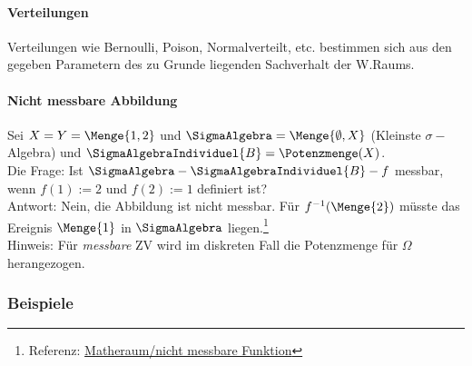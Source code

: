\paragraph{Verteilungen}
Verteilungen wie Bernoulli, Poison, Normalverteilt, etc. bestimmen sich aus den gegeben Parametern des zu Grunde liegenden Sachverhalt der \gls{W.}Raums.

\paragraph{Nicht messbare Abbildung}
Sei $X=Y=\Menge{1,2}$ und $\SigmaAlgebra = \Menge{\emptyset, X}$ (Kleinste $\sigma-$Algebra) und $\SigmaAlgebraIndividuel{B} = \Potenzmenge(X)$.\\

Die Frage: Ist $\SigmaAlgebra-\SigmaAlgebraIndividuel{B}-f$ messbar, wenn $f(1):=2$ und $f(2):=1$ definiert ist?\\

Antwort: Nein, die Abbildung ist nicht messbar. 
Für $f^{-1}(\Menge{2})$ müsste das Ereignis $\Menge{1}$ in $\SigmaAlgebra$ liegen.\footnote{Referenz: \href{https://matheraum.de/forum/nicht{\_}messbare{\_}Funktion/t725285}{Matheraum/nicht messbare Funktion}}\\


Hinweis: Für \textit{messbare} \gls{ZV} wird im diskreten Fall die Potenzmenge für $\Omega$ herangezogen.

	
\subsubsection{Beispiele}

